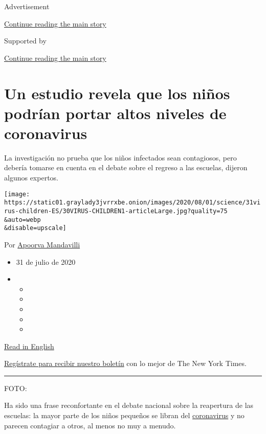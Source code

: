 Advertisement

\protect\hyperlink{after-top}{Continue reading the main story}

Supported by

\protect\hyperlink{after-sponsor}{Continue reading the main story}

\hypertarget{un-estudio-revela-que-los-niuxf1os-podruxedan-portar-altos-niveles-de-coronavirus}{%
\section{Un estudio revela que los niños podrían portar altos niveles de
coronavirus}\label{un-estudio-revela-que-los-niuxf1os-podruxedan-portar-altos-niveles-de-coronavirus}}

La investigación no prueba que los niños infectados sean contagiosos,
pero debería tomarse en cuenta en el debate sobre el regreso a las
escuelas, dijeron algunos expertos.

\texttt{[image: https://static01.graylady3jvrrxbe.onion/images/2020/08/01/science/31virus-children-ES/30VIRUS-CHILDREN1-articleLarge.jpg?quality=75\\\&auto=webp\\\&disable=upscale]}

Por
\href{https://www.nytimes3xbfgragh.onion/by/apoorva-mandavilli}{Apoorva
Mandavilli}

\begin{itemize}
\item
  31 de julio de 2020
\item
  \begin{itemize}
  \item
  \item
  \item
  \item
  \item
  \end{itemize}
\end{itemize}

\href{https://www.nytimes3xbfgragh.onion/2020/07/30/health/coronavirus-children.html}{Read
in English}

\href{https://www.nytimes3xbfgragh.onion/newsletters/el-times}{Regístrate
para recibir nuestro boletín} con lo mejor de The New York Times.

\begin{center}\rule{0.5\linewidth}{\linethickness}\end{center}

FOTO:

Ha sido una frase reconfortante en el debate nacional sobre la
reapertura de las escuelas: la mayor parte de los niños pequeños se
libran del
\href{https://www.nytimes3xbfgragh.onion/es/interactive/2020/espanol/mundo/coronavirus-en-estados-unidos.html}{coronavirus}
y no parecen contagiar a otros, al menos no muy a menudo.

